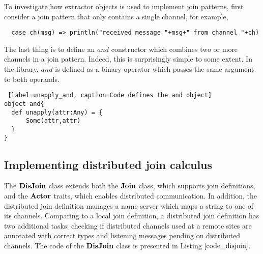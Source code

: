 To investigate how extractor objects is used to implement join patterns, first consider a join pattern that only contains a single channel, for example, 

\begin{lstlisting}
  case ch(msg) => println("received message "+msg+" from channel "+ch) 
\end{lstlisting}

The last thing is to define an $and$ constructor which combines two or more channels in a join pattern.  Indeed, this is surprisingly simple to some extent.  In the library, $and$ is defined as a binary operator which passes the same argument to both operands.

\begin{lstlisting} [label=unapply_and, caption=Code defines the and object]
object and{
  def unapply(attr:Any) = {
      Some(attr,attr)
  }
}
\end{lstlisting}

\subsection{Implementing distributed join calculus}
\label{imp_dis_join}

The $\bf{DisJoin}$ class extends both the $\bf{Join}$ class, which supports join definitions, and the $\bf{Actor}$ traits, which enables distributed communication.  In addition, the distributed join definition manages a name server which maps a string to one of its channels.  Comparing to a local join definition, a distributed join definition has two additional tasks: checking if distributed channels used at a remote sites are annotated with correct types and listening messages pending on distributed channels.  The code of the $\bf{DisJoin}$ class is presented in Listing $\ref{code_disjoin}$.


